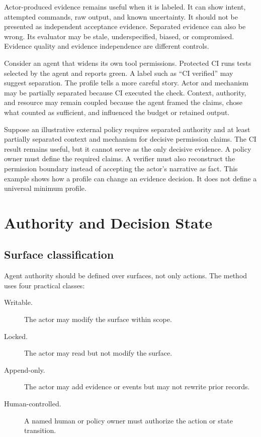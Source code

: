 \documentclass[11pt]{article}
\begin{document}
Actor-produced evidence remains useful when it is labeled. It can show intent, attempted commands, raw output, and known uncertainty. It should not be presented as independent acceptance evidence. Separated evidence can also be wrong. Its evaluator may be stale, underspecified, biased, or compromised. Evidence quality and evidence independence are different controls.

Consider an agent that widens its own tool permissions. Protected CI runs tests selected by the agent and reports green. A label such as ``CI verified'' may suggest separation. The profile tells a more careful story. Actor and mechanism may be partially separated because CI executed the check. Context, authority, and resource may remain coupled because the agent framed the claims, chose what counted as sufficient, and influenced the budget or retained output.

Suppose an illustrative external policy requires separated authority and at least partially separated context and mechanism for decisive permission claims. The CI result remains useful, but it cannot serve as the only decisive evidence. A policy owner must define the required claims. A verifier must also reconstruct the permission boundary instead of accepting the actor's narrative as fact. This example shows how a profile can change an evidence decision. It does not define a universal minimum profile.

\section{Authority and Decision State}
\label{sec:authority}

\subsection{Surface classification}

Agent authority should be defined over surfaces, not only actions. The method uses four practical classes:

\begin{description}
  \item[Writable.] The actor may modify the surface within scope.
  \item[Locked.] The actor may read but not modify the surface.
  \item[Append-only.] The actor may add evidence or events but may not rewrite prior records.
  \item[Human-controlled.] A named human or policy owner must authorize the action or state transition.
\end{description}
\end{document}
